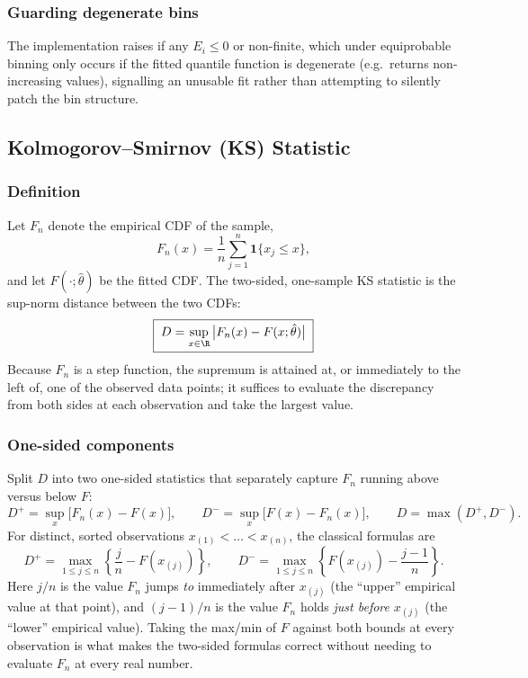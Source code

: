 \subsubsection{Guarding degenerate bins}
The implementation raises if any $E_i \le 0$ or non-finite, which under equiprobable binning
only occurs if the fitted quantile function is degenerate (e.g.\ returns non-increasing
values), signalling an unusable fit rather than attempting to silently patch the bin
structure.

\subsection{Kolmogorov--Smirnov (KS) Statistic}

\subsubsection{Definition}
Let $F_n$ denote the empirical CDF of the sample,
\[
F_n(x) = \frac{1}{n}\sum_{j=1}^n \mathbf{1}\{x_j \le x\},
\]
and let $F(\cdot;\hat\theta)$ be the fitted CDF. The two-sided, one-sample KS statistic is
the sup-norm distance between the two CDFs:
\[
\boxed{\;D = \sup_{x \in \R} \big| F_n(x) - F(x;\hat\theta) \big|\;}
\]
Because $F_n$ is a step function, the supremum is attained at, or immediately to the left
of, one of the observed data points; it suffices to evaluate the discrepancy from both
sides at each observation and take the largest value.

\subsubsection{One-sided components}
Split $D$ into two one-sided statistics that separately capture $F_n$ running above versus
below $F$:
\[
D^+ = \sup_x \big[F_n(x) - F(x)\big], \qquad
D^- = \sup_x \big[F(x) - F_n(x)\big], \qquad
D = \max(D^+, D^-).
\]
For distinct, sorted observations $x_{(1)} < \dots < x_{(n)}$, the classical formulas are
\[
D^+ = \max_{1\le j \le n}\left\{\frac{j}{n} - F(x_{(j)})\right\}, \qquad
D^- = \max_{1\le j \le n}\left\{F(x_{(j)}) - \frac{j-1}{n}\right\}.
\]
Here $j/n$ is the value $F_n$ jumps \emph{to} immediately after $x_{(j)}$ (the ``upper''
empirical value at that point), and $(j-1)/n$ is the value $F_n$ holds \emph{just before}
$x_{(j)}$ (the ``lower'' empirical value). Taking the max/min of $F$ against both bounds at
every observation is what makes the two-sided formulas correct without needing to evaluate
$F_n$ at every real number.

